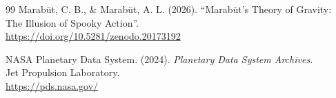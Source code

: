 \documentclass[11pt, a4paper]{article}
\begin{document}
\begin{thebibliography}{99}
  Marab\={u}t, C. B., \& Marab\={u}t, A. L. (2026). ``Marab\={u}t's Theory of Gravity: \\
  The Illusion of Spooky Action''. \\
  \url{https://doi.org/10.5281/zenodo.20173192}

   NASA Planetary Data System. (2024). \textit{Planetary Data System Archives}. \\
  Jet Propulsion Laboratory. \\
  \url{https://pds.nasa.gov/}
\end{thebibliography}
\end{document}
